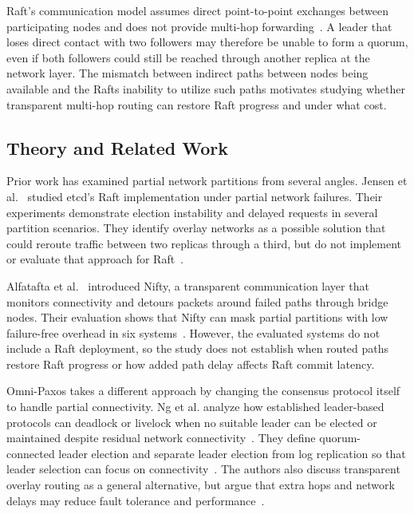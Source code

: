 \documentclass[11pt,a4paper]{article}
\begin{document}
Raft's communication model assumes direct point-to-point exchanges between participating nodes and does not provide multi-hop forwarding~\cite[Secs.~5.1--5.3]{ongaro2014raft}. 
A leader that loses direct contact with two followers may therefore be unable to form a quorum, even if both followers could still be reached through another replica at the network layer. 
The mismatch between indirect paths between nodes being available and the Rafts inability to utilize such paths motivates studying whether transparent multi-hop routing can restore Raft progress and under what cost.

\subsection{Theory and Related Work}

Prior work has examined partial network partitions from several angles. 
Jensen et al.~\cite[Sec.~4, Figs.~5--9]{jensen2021raft} studied etcd's Raft implementation under partial network failures. 
Their experiments demonstrate election instability and delayed requests in several partition scenarios. 
They identify overlay networks as a possible solution that could reroute traffic between two replicas through a third, but do not implement or evaluate that approach for Raft~\cite[Sec.~5]{jensen2021raft}.

Alfatafta et al.~\cite[Sec.~6]{alfatafta2020nifty} introduced Nifty, a transparent communication layer that monitors connectivity and detours packets around failed paths through bridge nodes. 
Their evaluation shows that Nifty can mask partial partitions with low failure-free overhead in six systems~\cite[Secs.~7.1--7.2]{alfatafta2020nifty}. 
However, the evaluated systems do not include a Raft deployment, so the study does not establish when routed paths restore Raft progress or how added path delay affects Raft commit latency.

Omni-Paxos takes a different approach by changing the consensus protocol itself to handle partial connectivity. 
Ng et al. analyze how established leader-based protocols can deadlock or livelock when no suitable leader can be elected or maintained despite residual network connectivity~\cite[Sec.~2, p.~117]{ng2023omnipaxos}. 
They define quorum-connected leader election and separate leader election from log replication so that leader selection can focus on connectivity~\cite[Sec.~5.1, p.~121]{ng2023omnipaxos}. 
The authors also discuss transparent overlay routing as a general alternative, but argue that extra hops and network delays may reduce fault tolerance and performance~\cite[Sec.~8, p.~127]{ng2023omnipaxos}. 
\end{document}
